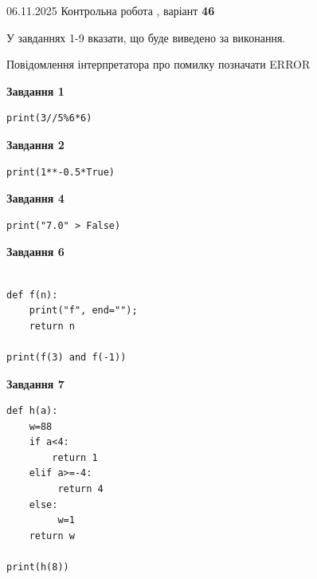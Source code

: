 \documentclass[12pt, ukrainian]{article}
\begin{document}
{\Large{06.11.2025 Контрольна робота , варіант  \No \textbf { 46 }\par}}
{
\begin {large}
У завданнях 1-9 вказати, що буде виведено за виконання.

Повідомлення інтерпретатора про помилку позначати ERROR

\begin{minipage}[t]{7.5cm}

\begin{center}
\textbf{Завдання 1}
\end{center}

\begin{verbatim}
print(3//5%6*6)
\end{verbatim}



\begin{center}
\textbf{Завдання 2}
\end{center}

\begin{verbatim}
print(1**-0.5*True)
\end{verbatim}



\begin{center}
\textbf{Завдання 4}
\end{center}

\begin{verbatim}
print("7.0" > False)
\end{verbatim}



\begin{center}
\textbf{Завдання 6}
\end{center}

\begin{verbatim}

def f(n):
    print("f", end="");
    return n

print(f(3) and f(-1))
\end{verbatim}



\begin{center}
\textbf{Завдання 7}
\end{center}

\begin{verbatim}
def h(a):
    w=88
    if a<4: 
        return 1
    elif a>=-4:
         return 4
    else:
         w=1
    return w

print(h(8))
\end{verbatim}


\end{minipage}
\end{large}}
\end{document}

